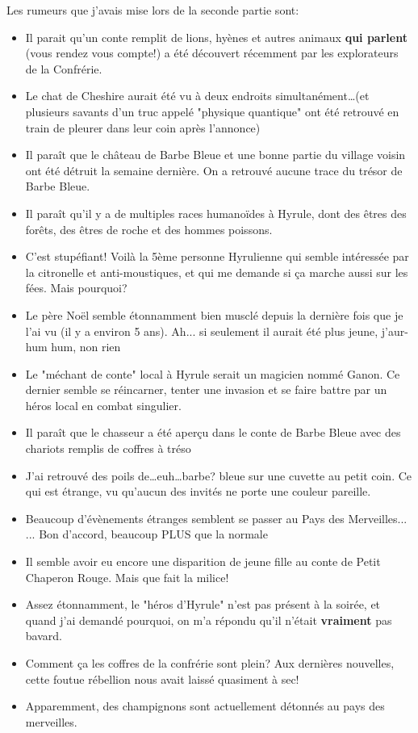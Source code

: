 {	\par Les rumeurs que j'avais mise lors de la seconde partie sont:
	\begin{itemize}
		\item Il parait qu'un conte remplit de lions, hyènes et autres animaux \textbf{qui parlent} (vous rendez vous compte!) a été découvert récemment par les explorateurs de la Confrérie.
		\item Le chat de Cheshire aurait été vu à deux endroits simultanément\dots (et plusieurs savants d'un truc appelé "physique quantique" ont été retrouvé en train de pleurer dans leur coin après l'annonce)
		\item Il paraît que le château de Barbe Bleue et une bonne partie du village voisin ont été détruit la semaine dernière. On a retrouvé aucune trace du trésor de Barbe Bleue.
		\item Il paraît qu'il y a de multiples races humanoïdes à Hyrule, dont des êtres des forêts, des êtres de roche et des hommes poissons.
		\item C'est stupéfiant! Voilà la 5ème personne Hyrulienne qui semble intéressée par la citronelle et anti-moustiques, et qui me demande si ça marche aussi sur les fées. Mais pourquoi?
		\item Le père Noël semble étonnamment bien musclé depuis la dernière fois que je l'ai vu (il y a environ 5 ans). Ah... si seulement il aurait été plus jeune, j'aur-hum hum, non rien
		\item Le "méchant de conte" local à Hyrule serait un magicien nommé Ganon. Ce dernier semble se réincarner, tenter une invasion et se faire battre par un héros local en combat singulier.
		\item Il paraît que le chasseur a été aperçu dans le conte de Barbe Bleue avec des chariots remplis de coffres à tréso
		\item J'ai retrouvé des poils de\dots euh\dots barbe? bleue sur une cuvette au petit coin. Ce qui est étrange, vu qu'aucun des invités ne porte une couleur pareille.
		\item Beaucoup d'évènements étranges semblent se passer au Pays des Merveilles... ... Bon d'accord, beaucoup PLUS que la normale
		\item Il semble avoir eu encore une disparition de jeune fille au conte de Petit Chaperon Rouge. Mais que fait la milice!
		\item Assez étonnamment, le "héros d'Hyrule" n'est pas présent à la soirée, et quand j'ai demandé pourquoi, on m'a répondu qu'il n'était \textbf{vraiment} pas bavard.
		\item Comment ça les coffres de la confrérie sont plein? Aux dernières nouvelles, cette foutue rébellion nous avait laissé quasiment à sec!
		\item Apparemment, des champignons sont actuellement détonnés au pays des merveilles.
	\end{itemize}
	
}
